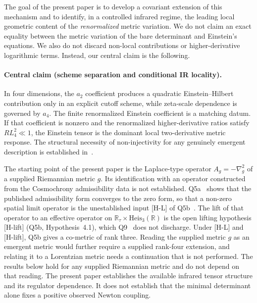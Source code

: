 \documentclass[pdflatex,sn-mathphys-num]{sn-jnl} %
\theoremstyle{remark}
\theoremstyle{plain}
\begin{document}
    The goal of the present paper is to develop a covariant extension of this mechanism and to identify, in a controlled
    infrared regime, the leading local geometric content of the \emph{renormalized} metric variation.
    We do not claim an exact equality between the metric variation of the bare determinant and Einstein's equations.
    We also do not discard non-local contributions or higher-derivative logarithmic terms.
    Instead, our central claim is the following.

    \paragraph{Central claim (scheme separation and conditional IR locality).}
      In four dimensions, the $a_2$ coefficient produces a quadratic Einstein--Hilbert contribution only in an
      explicit cutoff scheme, while zeta-scale dependence is governed by $a_4$.
      The finite renormalized Einstein coefficient is a matching datum.
      If that coefficient is nonzero and the renormalized higher-derivative ratios satisfy $R L_4^2\ll1$, the
      Einstein tensor is the dominant local two-derivative metric response.
      The structural necessity of non-injectivity for any genuinely emergent description is established
      in~\cite{Beau2026l}.

      The starting point of the present paper is the Laplace-type operator $A_g = -\nabla^2_g$ of a supplied
      Riemannian metric $g$.
      Its identification with an operator constructed from the Cosmochrony admissibility data is not established.
      Q5a~\cite{Beau2026q5a} shows that the published admissibility form converges to the zero form, so that a
      non-zero spatial limit operator is the unestablished input [H-L] of Q5b~\cite{Beau2026q5b}.
      The lift of that operator to an effective operator on
      $\mathbb{R}_\tau \times \mathrm{Heis}_3(\mathbb{R})$ is the open lifting hypothesis [H-lift] (Q5b,
      Hypothesis~4.1), which Q9~\cite{Beau2026q9} does not discharge.
      Under [H-L] and [H-lift], Q5b gives a co-metric of rank three.
      Reading the supplied metric $g$ as an emergent metric would further require a supplied rank-four extension,
      and relating it to a Lorentzian metric needs a continuation that is not performed.
      The results below hold for any supplied Riemannian metric and do not depend on that reading.
      The present paper establishes the available infrared tensor structure and its regulator dependence.
      It does not establish that the minimal determinant alone fixes a positive observed Newton coupling.
\end{document}
